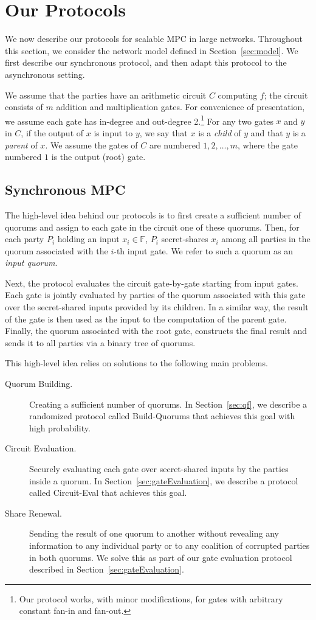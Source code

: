 \documentclass[11pt,letter]{article}
\newcommand{\F}{\mathbb{F}}
\theoremstyle{mytheoremstyle}
\begin{document}
\section{Our Protocols} \label{sec:alg}
We now describe our protocols for scalable MPC in large networks. Throughout this section, we consider the network model defined in Section~\ref{sec:model}. We first describe our synchronous protocol, and then adapt this protocol to the asynchronous setting.

We assume that the parties have an arithmetic circuit $C$ computing $f$; the circuit consists of $m$ addition and multiplication gates. For convenience of presentation, we assume each gate has in-degree and out-degree 2.\footnote{Our protocol works, with minor modifications, for gates with arbitrary constant fan-in and fan-out.} For any two gates $x$ and $y$ in $C$, if the output of $x$ is input to $y$, we say that $x$ is a \emph{child} of $y$ and that $y$ is a \emph{parent} of $x$. We assume the gates of $C$ are numbered $1, 2, \dots, m$, where the gate numbered $1$ is the output (root) gate. 

\subsection{Synchronous MPC}
The high-level idea behind our protocols is to first create a sufficient number of quorums and assign to each gate in the circuit one of these quorums. Then, for each party $P_i$ holding an input $x_i \in \F$, $P_i$ secret-shares $x_i$ among all parties in the quorum associated with the $i$-th input gate. We refer to such a quorum as an \emph{input quorum}. 

Next, the protocol evaluates the circuit gate-by-gate starting from input gates. Each gate is jointly evaluated by parties of the quorum associated with this gate over the secret-shared inputs provided by its children. In a similar way, the result of the gate is then used as the input to the computation of the parent gate. Finally, the quorum associated with the root gate, constructs the final result and sends it to all parties via a binary tree of quorums.

This high-level idea relies on solutions to the following main problems.
\begin{description}
	\item[Quorum Building.] Creating a sufficient number of quorums. In Section~\ref{sec:qf}, we describe a randomized protocol called \textsf{Build-Quorums} that achieves this goal with high probability. 
	
	\item[Circuit Evaluation.] Securely evaluating each gate over secret-shared inputs by the parties inside a quorum. In Section~\ref{sec:gateEvaluation}, we describe a protocol called \textsf{Circuit-Eval} that achieves this goal.
	
	\item[Share Renewal.] Sending the result of one quorum to another without revealing any information to any individual party or to any coalition of corrupted parties in both quorums. We solve this as part of our gate evaluation protocol described in Section~\ref{sec:gateEvaluation}.
\end{description}
\end{document}
